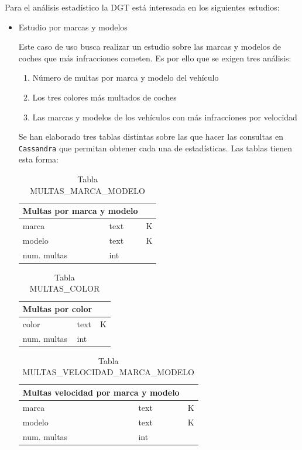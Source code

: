 \documentclass[]{article}
\begin{document}
Para el análisis estadístico la DGT está interesada en los siguientes estudios:
\begin{itemize}
    \item Estudio por marcas y modelos

    Este caso de uso busca realizar un estudio sobre las marcas y modelos de coches que más infracciones cometen. Es por ello que se exigen tres análisis:
    
    \begin{enumerate}
        \item Número de multas por marca y modelo del vehículo
        \item Los tres colores más multados de coches
        \item Las marcas y modelos de los vehículos con más infracciones por velocidad
    \end{enumerate}

    Se han elaborado tres tablas distintas sobre las que hacer las consultas en \texttt{Cassandra} que permitan obtener cada una de estadísticas. Las tablas tienen esta forma:
\begin{table}[H]
    \centering
    \begin{tabular}{lll} 
        \toprule
        \multicolumn{2}{c}{\large\textbf{Multas por marca y modelo}} \\ 
        \midrule
        marca       & text & K\\
        modelo      & text & K\\
        num. multas & int &\\
        \bottomrule
    \end{tabular}
    \caption {Tabla MULTAS\_MARCA\_MODELO}
\end{table}

\begin{table}[H]
    \centering
    \begin{tabular}{lll} 
        \toprule
        \multicolumn{2}{c}{\large\textbf{Multas por color}} \\ 
        \midrule
        color       & text & K\\
        num. multas & int & \\
        \bottomrule
    \end{tabular}
    \caption {Tabla MULTAS\_COLOR}
\end{table}

\begin{table}[H]
    \centering
    \begin{tabular}{lll} 
        \toprule
        \multicolumn{2}{c}{\large\textbf{Multas velocidad por marca y modelo}} \\ 
        \midrule
        marca      & text & K\\
        modelo     & text & K\\
        num. multas & int & \\
        \bottomrule
    \end{tabular} 
    \caption {Tabla MULTAS\_VELOCIDAD\_MARCA\_MODELO}
 \end{table}


\end{itemize}
\end{document}
